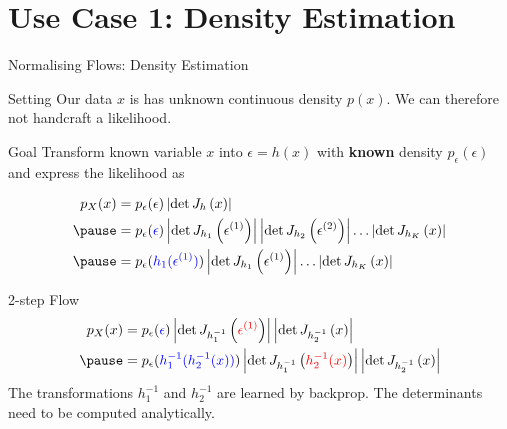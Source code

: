 \documentclass[14pt]{beamer}
\begin{document}
\section{Use Case 1: Density Estimation}
\begin{frame}
\tableofcontents[current]
\end{frame}

\begin{frame}{Normalising Flows: Density Estimation}
\begin{block}{Setting}
Our data $ x $ is has unknown continuous density $ p(x) $.
We can therefore not handcraft a likelihood.
\end{block}
\pause
\begin{block}{Goal}
Transform known variable $ x $ into $ \epsilon = h(x) $ with \textbf{known} density $ p_{\epsilon}(\epsilon) $ and express the likelihood as
\begin{small}
\pause
\begin{equation*}
\begin{aligned}
p_{X}(x) &= p_{\epsilon}(\epsilon)\djac{h}{x} \\ \pause
&= p_{\epsilon}(\textcolor{blue}{\epsilon})\djac{h_{1}}{\epsilon^{(1)}}\djac{h_{2}}{\epsilon^{(2)}}\ldots \djac{h_{K}}{x} \\ \pause
&= p_{\epsilon}(\textcolor{blue}{h_{1}(\epsilon^{(1)})})\djac{h_{1}}{\epsilon^{(1)}}\ldots \djac{h_{K}}{x}
\end{aligned}
\end{equation*}
\end{small}
\end{block}
\end{frame}

\begin{frame}{2-step Flow}
\begin{equation*}
\begin{aligned}
p_{X}(x) &= p_{\epsilon}(\textcolor{blue}{\epsilon})\djac{h_{1}^{-1}}{\textcolor{red}{\epsilon^{(1)}}}\djac{h_{2}^{-1}}{x} \\ \pause
&= p_{\epsilon}(\textcolor{blue}{h_{1}^{-1}(h_{2}^{-1}(x))})\djac{h_{1}^{-1}}{\textcolor{red}{h_{2}^{-1}(x)}}\djac{h_{2}^{-1}}{x}
\end{aligned}
\end{equation*}
\pause
The transformations $ h^{-1}_{1} $ and $ h^{-1}_{2} $ are learned by backprop. The determinants need to be computed analytically.
\end{frame}
\end{document}
